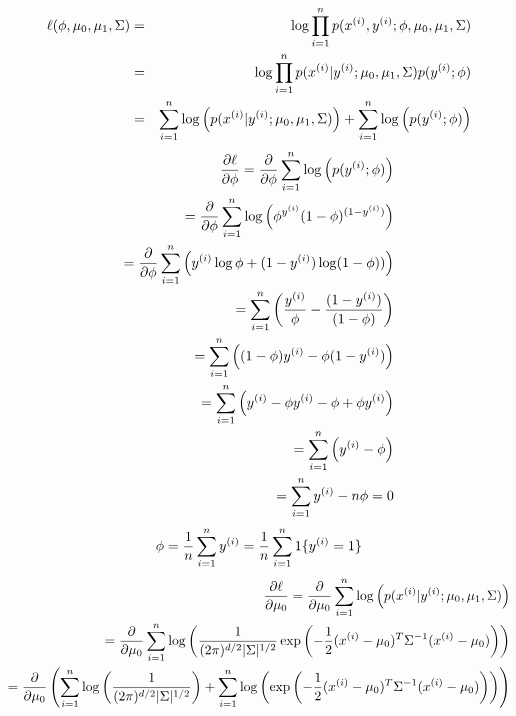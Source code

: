 \begin{answer}
  \begin{eqnarray*}
\ell(\phi, \mu_{0}, \mu_1, \Sigma) &=& \log \prod_{i=1}^{n} p(x^{(i)} , y^{(i)};\phi, \mu_{0}, \mu_1, \Sigma) \\
&=& \log \prod_{i=1}^{n} p(x^{(i)} | y^{(i)}; \mu_{0}, \mu_1, \Sigma) p(y^{(i)};\phi) \\
&=& \sum_{i=1}^{n} \log \left( p(x^{(i)} | y^{(i)}; \mu_{0}, \mu_1, \Sigma) \right) + \sum_{i=1}^{n} \log\left( p(y^{(i)};\phi)\right)
  \end{eqnarray*}
  \begin{eqnarray*}
\frac{\partial\ell}{\partial\phi}=\frac{\partial}{\partial\phi}\sum_{i=1}^{n} \log \left( p(y^{(i)};\phi)\right)\\
=\frac{\partial}{\partial\phi}\sum_{i=1}^{n} \log \left(\phi^{y^{(i)}} (1-\phi)^{(1-y^{(i)})} \right)\\
=\frac{\partial}{\partial\phi}\sum_{i=1}^{n} \left( y^{(i)}\log \phi+(1-y^{(i)})\log (1-\phi) ) \right)\\
=\sum_{i=1}^{n} \left( \frac{y^{(i)}}{\phi}-\frac{(1-y^{(i)})}{(1-\phi)}  \right)\\
=\sum_{i=1}^{n} \left( (1-\phi)y^{(i)}-\phi(1-y^{(i)})  \right)\\
=\sum_{i=1}^{n} \left( y^{(i)}-\phi y^{(i)}-\phi+\phi y^{(i)}  \right)\\
=\sum_{i=1}^{n} \left( y^{(i)}-\phi \right)\\
=\sum_{i=1}^{n} y^{(i)}-{n}\phi=0
  \end{eqnarray*}
  \begin{eqnarray*}
\phi=\frac{1}{{n}}\sum_{i=1}^{n} y^{(i)}=\frac{1}{{n}} \sum_{i=1}^{n} 1\{y^{(i)} = 1\}
  \end{eqnarray*}
  \begin{eqnarray*}
\frac{\partial\ell}{\partial\mu_{0}}=\frac{\partial}{\partial\mu_{0}}\sum_{i=1}^\nexp \log \left( p(x^{(i)} | y^{(i)}; \mu_{0}, \mu_1, \Sigma) \right)\\
=\frac{\partial}{\partial\mu_{0}}\sum_{i=1}^\nexp \log \left(\frac{1}{(2\pi)^{\di/2} |\Sigma|^{1/2}}\exp\left(-\frac{1}{2}(x^{(i)}-\mu_{0})^T \Sigma^{-1} (x^{(i)}-\mu_{0})\right) \right)\\
=\frac{\partial}{\partial\mu_{0}}\left(\sum_{i=1}^\nexp \log \left(\frac{1}{(2\pi)^{\di/2} |\Sigma|^{1/2}}\right)+\sum_{i=1}^\nexp \log\left(\exp\left(-\frac{1}{2}(x^{(i)}-\mu_{0})^T \Sigma^{-1} (x^{(i)}-\mu_{0})\right) \right)\right)\\

\end{eqnarray*}
\end{answer}
